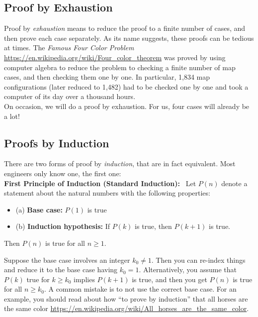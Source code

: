 \subsection{Proof by Exhaustion} 

Proof by \emph{exhaustion} means to reduce the proof to a finite number of cases, and then prove each case separately. As its name suggests, these proofs can be tedious at times. The \emph{Famous Four Color Problem} \url{https://en.wikipedia.org/wiki/Four_color_theorem} was proved by using computer algebra to reduce the problem to checking a finite number of map cases, and then checking them one by one. In particular, 1,834 map configurations (later reduced to 1,482) had to be checked one by one and took a computer of its day over a thousand hours. \\

On occasion, we will do a proof by exhaustion. For us, four cases will already be a lot!

\subsection{Proofs by Induction}

There are two forms of proof by \emph{induction}, that are in fact equivalent. Most engineers only know one, the first one:\\

 \textbf{First Principle of Induction (Standard Induction):}~ Let $P(n)$ denote a statement about the natural numbers with the following properties:
        \begin{itemize}
            \item[] (a) \textbf{Base case:} $P(1)$ is true
            \item[] (b) \textbf{Induction hypothesis:} If $P(k)$ is true, then $P(k+1)$ is true.
        \end{itemize}
Then $P(n)$ is true for all $n \geq 1$. \\

\begin{rem}
Suppose the base case involves an integer $k_0 \neq 1$. Then you can re-index things and reduce it to the base case having $k_0=1$. Alternatively, you assume that $P(k)$ true for $k \ge k_0$ implies  $P(k+1)$ is true, and then you get $P(n)$ is true for all $n \geq k_0$. A common mistake is to not use the correct base case. For an example, you should read about how ``to prove by induction'' that all horses are the same color \url{https://en.wikipedia.org/wiki/All_horses_are_the_same_color}. 
\end{rem} 


